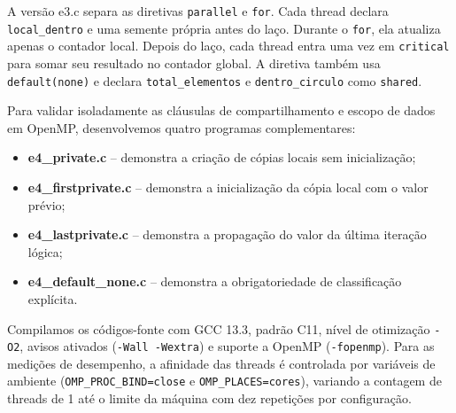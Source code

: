 \documentclass[11pt,letterpaper]{article}
\begin{document}
A versão e3.c separa as diretivas \texttt{parallel} e \texttt{for}. Cada thread declara \texttt{local\_dentro} e uma semente própria antes do laço. Durante o \texttt{for}, ela atualiza apenas o contador local. Depois do laço, cada thread entra uma vez em \texttt{critical} para somar seu resultado no contador global. A diretiva também usa \texttt{default(none)} e declara \texttt{total\_elementos} e \texttt{dentro\_circulo} como \texttt{shared}.

Para validar isoladamente as cláusulas de compartilhamento e escopo de dados em OpenMP, desenvolvemos quatro programas complementares:
\begin{itemize}
    \item \textbf{e4\_private.c} -- demonstra a criação de cópias locais sem inicialização;
    \item \textbf{e4\_firstprivate.c} -- demonstra a inicialização da cópia local com o valor prévio;
    \item \textbf{e4\_lastprivate.c} -- demonstra a propagação do valor da última iteração lógica;
    \item \textbf{e4\_default\_none.c} -- demonstra a obrigatoriedade de classificação explícita.
\end{itemize}

















Compilamos os códigos-fonte com GCC 13.3, padrão C11, nível de otimização \texttt{-O2}, avisos ativados (\texttt{-Wall -Wextra}) e suporte a OpenMP (\texttt{-fopenmp}). Para as medições de desempenho, a afinidade das threads é controlada por variáveis de ambiente (\texttt{OMP\_PROC\_BIND=close} e \texttt{OMP\_PLACES=cores}), variando a contagem de threads de 1 até o limite da máquina com dez repetições por configuração.
\end{document}
